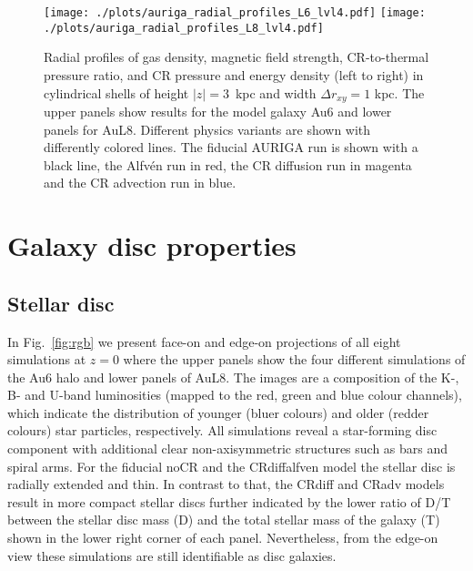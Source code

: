 \documentclass[useAMS,usenatbib]{mnras}
\begin{document}
\begin{figure*}
\vspace{-.25 cm}
\begin{center}
\texttt{[image: ./plots/auriga\_radial\_profiles\_L6\_lvl4.pdf]}
\texttt{[image: ./plots/auriga\_radial\_profiles\_L8\_lvl4.pdf]}
\end{center}
\vspace{-.6cm}
\caption{Radial profiles of gas density, magnetic field strength, CR-to-thermal pressure ratio, and CR pressure and energy density (left to right) in cylindrical shells of height $\vert z\vert=3$~kpc and width $\Delta r_{xy}=1$ kpc. The upper panels show results for the model galaxy Au6 and lower panels for AuL8. Different physics variants are shown with differently colored lines. The fiducial AURIGA run is shown with a black line, the Alfv\'en run in red, the CR diffusion run in magenta and the CR advection run in blue.}
\label{fig:prof}
\end{figure*}


\section{Galaxy disc properties} \label{sec:props}


\subsection{Stellar disc}

In Fig.\ \ref{fig:rgb} we present face-on and edge-on projections of all eight simulations at $z = 0$ where the upper panels show the four different simulations of the Au6 halo and lower panels of AuL8. The images are a composition of the K-, B- and U-band luminosities (mapped to the red, green and blue colour channels), which indicate the distribution of younger (bluer colours) and older (redder colours) star particles, respectively. All simulations reveal a star-forming disc component with additional clear non-axisymmetric structures such as bars and spiral arms. For the fiducial noCR and the CRdiffalfven model the stellar disc is radially extended and thin. In contrast to that, the CRdiff and CRadv models result in more compact stellar discs further indicated by the lower ratio of D/T between the stellar disc mass (D) and the total stellar mass of the galaxy (T) shown in the lower right corner of each panel. Nevertheless, from the edge-on view these simulations are still identifiable as disc galaxies.
\end{document}
